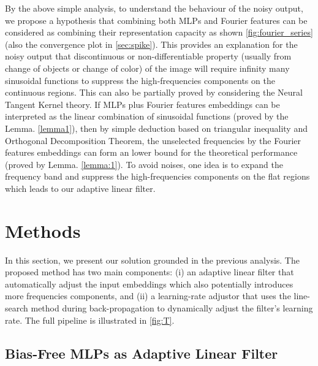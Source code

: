By the above simple analysis, to understand the behaviour of the noisy output, we propose a hypothesis that combining both MLPs and Fourier features can be considered as combining their representation capacity as shown \autoref{fig:fourier_series} (also the convergence plot in \autoref{sec:spike}). This provides an explanation for the noisy output that discontinuous or non-differentiable property (usually from change of objects or change of color) of the image will require infinity many sinusoidal functions to suppress the high-frequencies components on the continuous regions. This can also be partially proved by considering the Neural Tangent Kernel theory. If MLPs plus Fourier features embeddings can be interpreted as the linear combination of sinusoidal functions (proved by the Lemma. \ref{lemma1}), then by simple deduction based on triangular inequality and Orthogonal Decomposition Theorem, the unselected frequencies by the Fourier features embeddings can form an lower bound for the theoretical performance (proved by Lemma. \ref{lemma:1}).
To avoid noises, one idea is to expand the frequency band and suppress the high-frequencies components on the flat regions which leads to our adaptive linear filter.

%

\section{Methods}

In this section, we present our solution grounded in the previous analysis. The proposed method has two main components: (i) an adaptive linear filter that automatically adjust the input embeddings which also potentially introduces more frequencies components, and (ii) a learning-rate adjustor that uses the line-search method during back-propagation to dynamically adjust the filter's learning rate. The full pipeline is illustrated in \autoref{fig:T}.
\subsection{Bias-Free MLPs as Adaptive Linear Filter}

